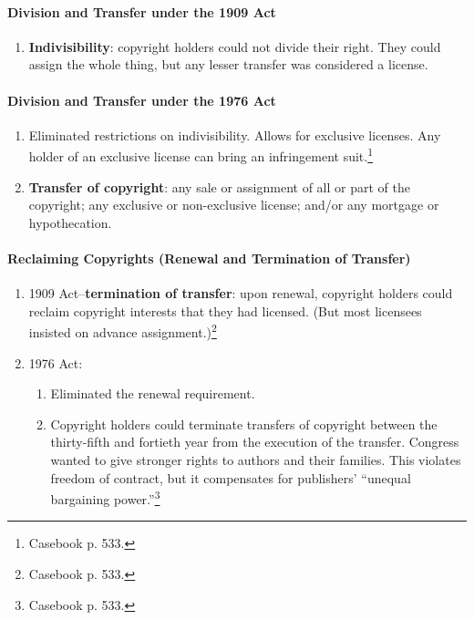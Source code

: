 \paragraph{Division and Transfer under the 1909 Act}

\begin{enumerate}
    \item \textbf{Indivisibility}: copyright holders could not divide their 
    right. They could assign the whole thing, but any lesser transfer was 
    considered a license.
\end{enumerate}

\paragraph{Division and Transfer under the 1976 Act}

\begin{enumerate}
    \item Eliminated restrictions on indivisibility. Allows for exclusive 
    licenses. Any holder of an exclusive license can bring an infringement 
    suit.\footnote{Casebook p. 533.}
    \item \textbf{Transfer of copyright}: any sale or assignment of all or 
    part of the copyright; any exclusive or non-exclusive license; and/or any 
    mortgage or hypothecation.
\end{enumerate}

\paragraph{Reclaiming Copyrights (Renewal and Termination of Transfer)}

\begin{enumerate}
    \item 1909 Act--\textbf{termination of transfer}: upon renewal, copyright 
    holders could reclaim copyright interests that they had licensed. (But 
    most licensees insisted on advance assignment.)\footnote{Casebook p. 533.}
    \item 1976 Act:
    \begin{enumerate}
        \item Eliminated the renewal requirement.
        \item Copyright holders could terminate transfers of copyright between 
        the thirty-fifth and fortieth year from the execution of the transfer. 
        Congress wanted to give stronger rights to authors and their families. 
        This violates freedom of contract, but it compensates for publishers' 
        ``unequal bargaining power.''\footnote{Casebook p. 533.}
    \end{enumerate}
\end{enumerate}

